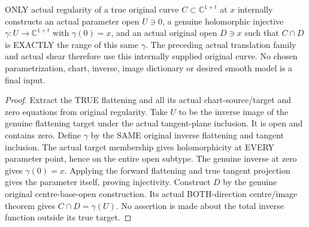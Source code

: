 \begin{theorem}
\label{hir:original-regular-curve-actual-translation-parameter}
\leanok
ONLY actual regularity of a true original curve $C\subset\mathbb C^{1+t}$
at $x$ internally constructs an actual parameter open $U\ni0$, a genuine
holomorphic injective $\gamma:U\to\mathbb C^{1+t}$ with $\gamma(0)=x$,
and an actual original open $D\ni x$ such that $C\cap D$ is EXACTLY the
range of this same $\gamma$. The preceding actual translation family and
actual shear therefore use this internally supplied original curve.
No chosen parametrization, chart, inverse, image dictionary or desired
smooth model is a final input.
\end{theorem}
\begin{proof}
Extract the TRUE flattening and all its actual chart-source/target and
zero equations from original regularity. Take $U$ to be the inverse image
of the genuine flattening target under the actual tangent-plane inclusion.
It is open and contains zero. Define $\gamma$ by the SAME original inverse
flattening and tangent inclusion. The actual target membership gives
holomorphicity at EVERY parameter point, hence on the entire open subtype.
The genuine inverse at zero gives $\gamma(0)=x$. Applying the forward
flattening and true tangent projection gives the parameter itself, proving
injectivity. Construct $D$ by the genuine original centre-base-open
construction. Its actual BOTH-direction centre/image theorem gives
$C\cap D=\gamma(U)$. No assertion is made about the total inverse function
outside its true target.
\end{proof}

